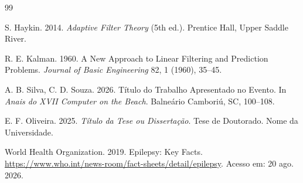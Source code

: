 \documentclass[sigconf, nonacm, screen, language=portuguese, language=spanish, language={main=english}]{acmart}             %
\begin{document}

\begin{thebibliography}{99}

S. Haykin. 2014. \textit{Adaptive Filter Theory} (5th ed.). Prentice Hall, Upper Saddle River.

R. E. Kalman. 1960. A New Approach to Linear Filtering and Prediction Problems. \textit{Journal of Basic Engineering} 82, 1 (1960), 35--45.

A. B. Silva, C. D. Souza. 2026. Título do Trabalho Apresentado no Evento. In \textit{Anais do XVII Computer on the Beach}. Balneário Camboriú, SC, 100--108.

E. F. Oliveira. 2025. \textit{Título da Tese ou Dissertação}. Tese de Doutorado. Nome da Universidade.

World Health Organization. 2019. Epilepsy: Key Facts. \url{https://www.who.int/news-room/fact-sheets/detail/epilepsy}. Acesso em: 20 ago. 2026.

\end{thebibliography}
\end{document}
